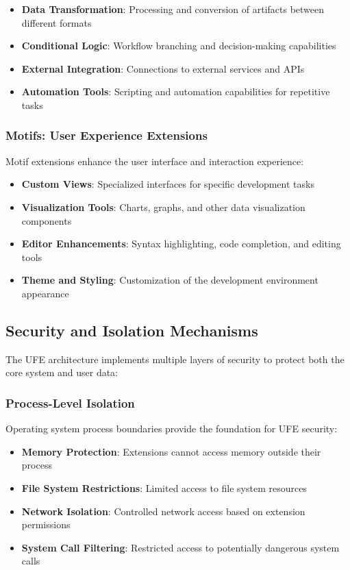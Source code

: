 \begin{itemize}
    \item \textbf{Data Transformation}: Processing and conversion of artifacts between different formats
    \item \textbf{Conditional Logic}: Workflow branching and decision-making capabilities
    \item \textbf{External Integration}: Connections to external services and APIs
    \item \textbf{Automation Tools}: Scripting and automation capabilities for repetitive tasks
\end{itemize}

\subsubsection{Motifs: User Experience Extensions}

Motif extensions enhance the user interface and interaction experience:

\begin{itemize}
    \item \textbf{Custom Views}: Specialized interfaces for specific development tasks
    \item \textbf{Visualization Tools}: Charts, graphs, and other data visualization components
    \item \textbf{Editor Enhancements}: Syntax highlighting, code completion, and editing tools
    \item \textbf{Theme and Styling}: Customization of the development environment appearance
\end{itemize}

\subsection{Security and Isolation Mechanisms}

The UFE architecture implements multiple layers of security to protect both the core system and user data:

\subsubsection{Process-Level Isolation}

Operating system process boundaries provide the foundation for UFE security:

\begin{itemize}
    \item \textbf{Memory Protection}: Extensions cannot access memory outside their process
    \item \textbf{File System Restrictions}: Limited access to file system resources
    \item \textbf{Network Isolation}: Controlled network access based on extension permissions
    \item \textbf{System Call Filtering}: Restricted access to potentially dangerous system calls
\end{itemize}

